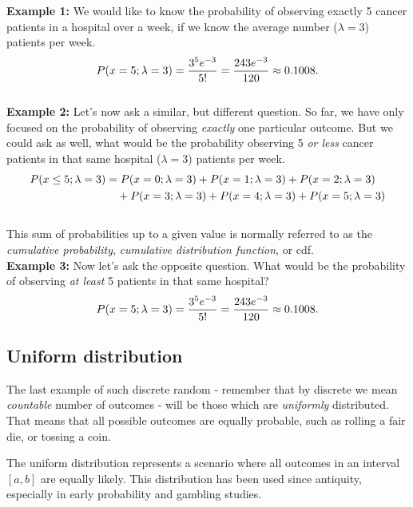 \documentclass{book}
\begin{document}
\textbf{Example 1:} We would like to know the probability of observing exactly 5 cancer patients in a hospital over a week, if we know the average number ($\lambda = 3$) patients per week.
\begin{equation}
    P(x=5; \lambda = 3) = \frac{3^5 e^{-3}}{5!} = \frac{243 e^{-3}}{120} \approx 0.1008. \notag
\end{equation}\\

\textbf{Example 2:} Let's now ask a similar, but different question. So far, we have only focused on the probability of observing \textit{exactly} one particular outcome. But we could ask as well, what would be the probability observing 5 \textit{or less} cancer patients in that same hospital ($\lambda = 3$) patients per week.
\begin{align}
    P(x \leq 5; \lambda = 3) &= P(x=0; \lambda = 3) + P(x=1; \lambda = 3) + P(x=2; \lambda = 3) \notag \\
    &\quad + P(x=3; \lambda = 3) + P(x=4; \lambda = 3) + P(x=5; \lambda = 3) \notag
\end{align}\\

This sum of probabilities up to a given value is normally referred to as the \textit{cumulative probability}, \textit{cumulative distribution function}, or cdf.\\

\textbf{Example 3:} Now let's ask the opposite question. What would be the probability of observing \textit{at least} 5 patients in that same hospital?
\begin{equation}
    P(x=5; \lambda = 3) = \frac{3^5 e^{-3}}{5!} = \frac{243 e^{-3}}{120} \approx 0.1008. \notag
\end{equation}

\newpage
\subsection{Uniform distribution}
The last example of such discrete random - remember that by discrete we mean \textit{countable} number of outcomes -  will be those which are \textit{uniformly} distributed. That means that all possible outcomes are equally probable, such as rolling a fair die, or tossing a coin.

The uniform distribution represents a scenario where all outcomes in an interval $[a, b]$ are equally likely. This distribution has been used since antiquity, especially in early probability and gambling studies.
\end{document}

